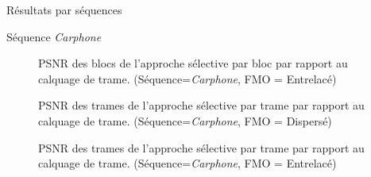 \begin{section}{Résultats par séquences}
\begin{subsection}{Séquence \textit{Carphone}}
\begin{figure}  \caption[]{PSNR des blocs de l'approche sélective par bloc par rapport au
calquage de trame. (Séquence=\textit{Carphone}, FMO = Entrelacé)}
\label{fig-ParSequenceInterleaved4}
\end{figure}

\begin{figure}  \caption[]{PSNR des trames de l'approche sélective par trame par rapport au
calquage de trame. (Séquence=\textit{Carphone}, FMO = Dispersé)}
\label{fig-ParSequenceFrameDispersed4}
\end{figure}

\begin{figure}  \caption[]{PSNR des trames de l'approche sélective par trame par rapport au
calquage de trame. (Séquence=\textit{Carphone}, FMO = Entrelacé)}
\label{fig-ParSequenceFrameInterleaved4}
\end{figure}


\end{subsection}
\end{section}
